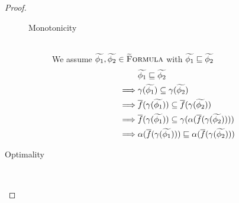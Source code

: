 \begin{proof}
\begin{description}
\begin{description}
            \item[Monotonicity]~\\ 
            We assume $\widetilde{\phi_1}, \widetilde{\phi_2} \in \textup{\textsc{\ensuremath{\widetilde{\text{F}}}ormula}}$ with $\widetilde{\phi_1} \sqsubseteq \widetilde{\phi_2}$
            \begin{align*}
            &\grad{\phi_1} \mpt \grad{\phi_2}\\
            \implies
            &\gamma(\grad{\phi_1}) \subseteq \gamma(\grad{\phi_2})\\
            \implies
            &\overline{f}(\gamma(\grad{\phi_1})) \subseteq \overline{f}(\gamma(\grad{\phi_2}))\\
            \implies %
            &\overline{f}(\gamma(\grad{\phi_1})) \subseteq \gamma(\alpha(\overline{f}(\gamma(\grad{\phi_2}))))\\
            \implies %
            &\alpha(\overline{f}(\gamma(\grad{\phi_1}))) \mpt \alpha(\overline{f}(\gamma(\grad{\phi_2})))\\
            \end{align*}
        \end{description}
        
        \item[Optimality]~\\
        

\end{description}
\end{proof}
